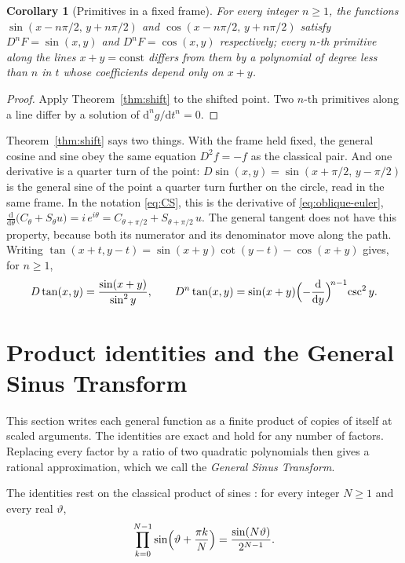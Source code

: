 \documentclass[11pt]{amsart}
\newtheorem{cor}[thm]{Corollary}
\theoremstyle{definition}
\theoremstyle{remark}
\numberwithin{equation}{section}
\begin{document}
\begin{cor}[Primitives in a fixed frame]
\label{cor:primitives}
For every integer $n \ge 1$, the functions
$\sin(x - n\pi/2,\, y + n\pi/2)$ and $\cos(x - n\pi/2,\, y + n\pi/2)$
satisfy $D^n F = \sin(x,y)$ and $D^n F = \cos(x,y)$ respectively; every
$n$-th primitive along the lines $x+y = \text{const}$ differs from them by
a polynomial of degree less than $n$ in $t$ whose coefficients depend only
on $x+y$.
\end{cor}

\begin{proof}
Apply Theorem~\ref{thm:shift} to the shifted point. Two $n$-th primitives
along a line differ by a solution of $\mathrm{d}^n g/\mathrm{d}t^n = 0$.
\end{proof}

Theorem~\ref{thm:shift} says two things. With the frame held fixed, the
general cosine and sine obey the same equation $D^2 f = -f$ as the
classical pair. And one derivative is a quarter turn of the point:
$D\sin(x,y) = \sin(x+\pi/2,\,y-\pi/2)$ is the general sine of the point a
quarter turn further on the circle, read in the same frame. In the
notation \eqref{eq:CS}, this is the derivative of \eqref{eq:oblique-euler},
$\frac{\mathrm d}{\mathrm d\theta}\bigl(C_\theta + S_\theta u\bigr) = i\,e^{i\theta}
= C_{\theta+\pi/2} + S_{\theta+\pi/2}\,u$. The general tangent does not have this property, because both its
numerator and its denominator move along the path. Writing
$\tan(x+t,y-t) = \sin(x+y)\cot(y-t) - \cos(x+y)$ gives, for $n \ge 1$,
\[
D\tan(x,y) = \frac{\sin(x+y)}{\sin^2 y}, \qquad
D^n\tan(x,y) = \sin(x+y)\Bigl(-\frac{\mathrm d}{\mathrm dy}\Bigr)^{\!n-1}\!\csc^2 y .
\]

\section{Product identities and the General Sinus Transform}
\label{sec:products}

This section writes each general function as a finite product of copies
of itself at scaled arguments. The identities are exact and hold for any
number of factors. Replacing every factor by a ratio of two quadratic
polynomials then gives a rational approximation, which we call the
\emph{General Sinus Transform}.

The identities rest on the classical product of sines
\cite[\S 1.39]{GradshteynRyzhik2015}: for every integer $N \geq 1$ and
every real $\vartheta$,
\begin{equation}
\label{eq:product_of_sines}
\prod_{k=0}^{N-1} \sin\Bigl(\vartheta + \frac{\pi k}{N}\Bigr)
= \frac{\sin(N\vartheta)}{2^{N-1}} .
\end{equation}
\end{document}
